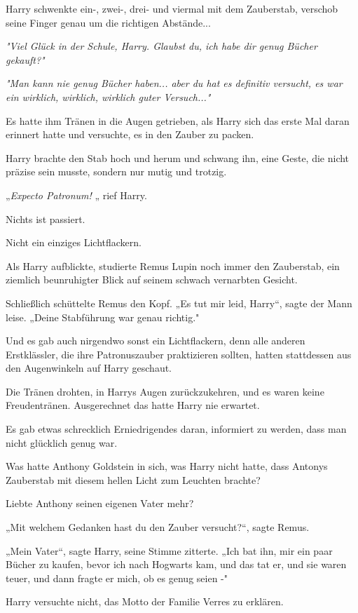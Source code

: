 {Harry schwenkte ein-, zwei-, drei- und viermal mit dem Zauberstab, verschob seine Finger genau um die richtigen Abstände...

\emph{\emph{"Viel Glück in der Schule, Harry. Glaubst du, ich habe dir genug Bücher gekauft?"}}

\emph{\emph{"Man kann nie genug Bücher haben... aber du hat es} \emph{definitiv} \emph{versucht, es war ein wirklich, wirklich, wirklich guter Versuch..."}}

Es hatte ihm Tränen in die Augen getrieben, als Harry sich das erste Mal daran erinnert hatte und versuchte, es in den Zauber zu packen.

Harry brachte den Stab hoch und herum und schwang ihn, eine Geste, die nicht präzise sein musste, sondern nur mutig und trotzig.

„\emph{Expecto Patronum!} „ rief Harry.

Nichts ist passiert.

Nicht ein einziges Lichtflackern.

Als Harry aufblickte, studierte Remus Lupin noch immer den Zauberstab, ein ziemlich beunruhigter Blick auf seinem schwach vernarbten Gesicht.

Schließlich schüttelte Remus den Kopf. „Es tut mir leid, Harry“, sagte der Mann leise. „Deine Stabführung war genau richtig."

Und es gab auch nirgendwo sonst ein Lichtflackern, denn alle anderen Erstklässler, die ihre Patronuszauber praktizieren sollten, hatten stattdessen aus den Augenwinkeln auf Harry geschaut.

Die Tränen drohten, in Harrys Augen zurückzukehren, und es waren keine Freudentränen. Ausgerechnet das hatte Harry nie erwartet.

Es gab etwas schrecklich Erniedrigendes daran, informiert zu werden, dass man nicht glücklich genug war.

Was hatte Anthony Goldstein in sich, was Harry nicht hatte, dass Antonys Zauberstab mit diesem hellen Licht zum Leuchten brachte?

Liebte Anthony seinen eigenen Vater mehr?

„Mit welchem Gedanken hast du den Zauber versucht?“, sagte Remus.

„Mein Vater“, sagte Harry, seine Stimme zitterte. „Ich bat ihn, mir ein paar Bücher zu kaufen, bevor ich nach Hogwarts kam, und das tat er, und sie waren teuer, und dann fragte er mich, ob es genug seien -"

Harry versuchte nicht, das Motto der Familie Verres zu erklären.

}
